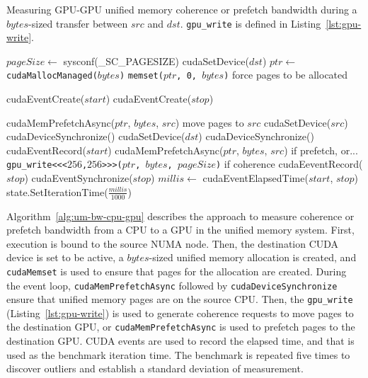 \begin{algorithm}[H]
	\caption[Measuring GPU-GPU Unified Memory Coherence or Prefetch Bandwidth.]{
		Measuring GPU-GPU unified memory coherence or prefetch bandwidth during a $bytes$-sized transfer between $src$ and $dst$.
		\texttt{gpu\_write} is defined in Listing~\ref{lst:gpu-write}.
	}
	\label{alg:um-bw-gpu-gpu}
	\begin{algorithmic}[1]
		\Statex
		
		\State $pageSize \gets$ sysconf(\_SC\_PAGESIZE)
		\State cudaSetDevice($dst$)
		\State $ptr \gets$ \texttt{cudaMallocManaged($bytes$)}
		\State \texttt{memset($ptr$, 0, $bytes$)} \Comment force pages to be allocated

		\State cudaEventCreate($start$)
		\State cudaEventCreate($stop$)		        
				
			\State cudaMemPrefetchAsync($ptr$, $bytes$, $src$) \Comment move pages to $src$
			\State cudaSetDevice($src$)
			\State cudaDeviceSynchronize()
			\State cudaSetDevice($dst$)
			\State cudaDeviceSynchronize()
			\State cudaEventRecord($start$)
			\State cudaMemPrefetchAsync($ptr$, $bytes$, $src$) \Comment if prefetch, or...
			\State \texttt{gpu\_write<<<$256$,$256$>>>($ptr$, $bytes$, $pageSize$)} \Comment if coherence
			\State cudaEeventRecord($stop$)
			\State cudaEventSynchronize($stop$)
			\State $millis \gets$ cudaEventElapsedTime($start$, $stop$)
			\State state.SetIterationTime($\frac{millis}{1000}$)
		\EndFor
		\EndFunction			
	\end{algorithmic}
\end{algorithm}

Algorithm~\ref{alg:um-bw-cpu-gpu} describes the approach to measure coherence or prefetch bandwidth from a CPU to a GPU in the unified memory system.
First, execution is bound to the source NUMA node.
Then, the destination CUDA device is set to be active, a $bytes$-sized unified memory allocation is created, and \texttt{cudaMemset} is used to ensure that pages for the allocation are created.
During the event loop, \texttt{cudaMemPrefetchAsync} followed by \texttt{cudaDeviceSynchronize} ensure that unified memory pages are on the source CPU.
Then, the \texttt{gpu\_write} (Listing~\ref{lst:gpu-write}) is used to generate coherence requests to move pages to the destination GPU, or \texttt{cudaMemPrefetchAsync} is used to prefetch pages to the destination GPU.
CUDA events are used to record the elapsed time, and that is used as the benchmark iteration time.
The benchmark is repeated five times to discover outliers and establish a standard deviation of measurement.

